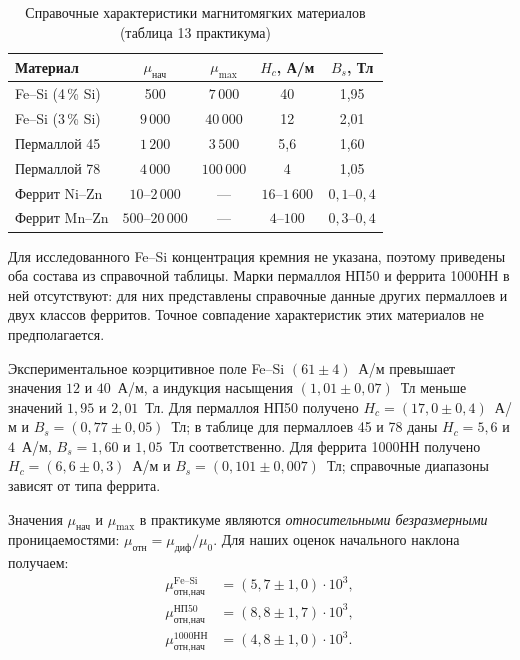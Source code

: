 \documentclass[12pt,a4paper]{article}
\begin{document}
\begin{table}[H]
 \centering
 \caption{Справочные характеристики магнитомягких материалов
 (таблица 13 практикума)}
 \label{tab:ref_compare}
 \small
 \setlength{\tabcolsep}{4.8pt}
 \begin{tabular}{l c c c c}
 \toprule
 Материал & $\mu_{\text{нач}}$ & $\mu_{\max}$ & $H_c$, А/м & $B_s$, Тл \\
 \midrule
 Fe--Si (4\,\% Si) & 500 & $7\,000$ & 40 & 1,95 \\
 Fe--Si (3\,\% Si) & $9\,000$ & $40\,000$ & 12 & 2,01 \\
 Пермаллой 45 & $1\,200$ & $3\,500$ & 5,6 & 1,60 \\
 Пермаллой 78 & $4\,000$ & $100\,000$ & 4 & 1,05 \\
 Феррит Ni--Zn & $10$--$2\,000$ & --- & $16$--$1\,600$ & $0{,}1$--$0{,}4$ \\
 Феррит Mn--Zn & $500$--$20\,000$ & --- & $4$--$100$ & $0{,}3$--$0{,}4$ \\
 \bottomrule
 \end{tabular}
\end{table}

Для исследованного Fe--Si концентрация кремния не указана,
поэтому приведены оба состава из справочной таблицы.
Марки пермаллоя НП50 и феррита 1000НН в ней отсутствуют:
для них представлены справочные данные других пермаллоев
и двух классов ферритов. Точное совпадение характеристик
этих материалов не предполагается.

Экспериментальное коэрцитивное поле Fe--Si
$(61\pm4)$~А/м превышает значения $12$ и $40$~А/м,
а индукция насыщения $(1{,}01\pm0{,}07)$~Тл меньше
значений $1{,}95$ и $2{,}01$~Тл.
Для пермаллоя НП50 получено $H_c=(17{,}0\pm0{,}4)$~А/м
и $B_s=(0{,}77\pm0{,}05)$~Тл; в таблице для
пермаллоев 45 и 78 даны $H_c=5{,}6$ и $4$~А/м,
$B_s=1{,}60$ и $1{,}05$~Тл соответственно.
Для феррита 1000НН получено $H_c=(6{,}6\pm0{,}3)$~А/м
и $B_s=(0{,}101\pm0{,}007)$~Тл;
справочные диапазоны зависят от типа феррита.

Значения $\mu_{\text{нач}}$ и $\mu_{\max}$ в практикуме
являются \emph{относительными безразмерными} проницаемостями:
$\mu_{\text{отн}}=\mu_{\text{диф}}/\mu_0$.
Для наших оценок начального наклона получаем:
\[
\begin{aligned}
 \mu_{\text{отн,нач}}^{\text{Fe--Si}} &= (5{,}7\pm1{,}0)\cdot10^3,\\
 \mu_{\text{отн,нач}}^{\text{НП50}} &= (8{,}8\pm1{,}7)\cdot10^3,\\
 \mu_{\text{отн,нач}}^{\text{1000НН}} &= (4{,}8\pm1{,}0)\cdot10^3.
\end{aligned}
\]
\end{document}
